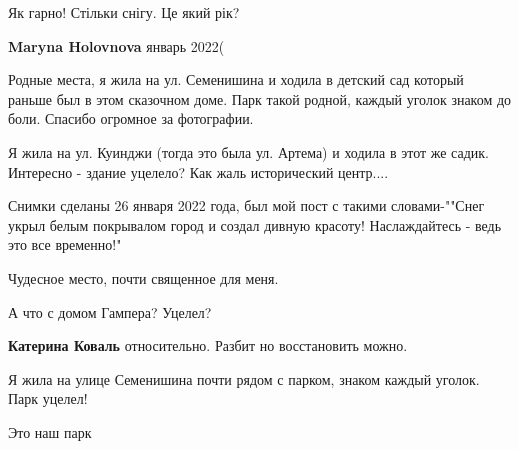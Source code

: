  
 
 
 
 

\qqSecCmt


Як гарно! Стільки снігу. Це який рік?

\begin{itemize} %
\textbf{Maryna Holovnova} январь 2022(
\end{itemize} %


Родные места, я жила на ул. Семенишина и ходила в детский сад который раньше
был в этом сказочном доме. Парк такой родной, каждый уголок знаком до боли.
Спасибо огромное за фотографии.


Я жила на ул. Куинджи (тогда это была ул. Артема) и ходила в этот же садик.
Интересно - здание уцелело? Как жаль исторический центр....


Снимки сделаны 26 января 2022 года, был мой пост с такими словами-""Снег укрыл
белым покрывалом город и создал дивную красоту! Наслаждайтесь - ведь это все
временно!"


Чудесное место, почти священное для меня.


А что с домом Гампера? Уцелел?

\begin{itemize} %
\textbf{Катерина Коваль} относительно. Разбит но восстановить можно.
\end{itemize} %


Я жила на улице Семенишина почти рядом с парком, знаком каждый уголок. Парк
уцелел!


Это наш парк

